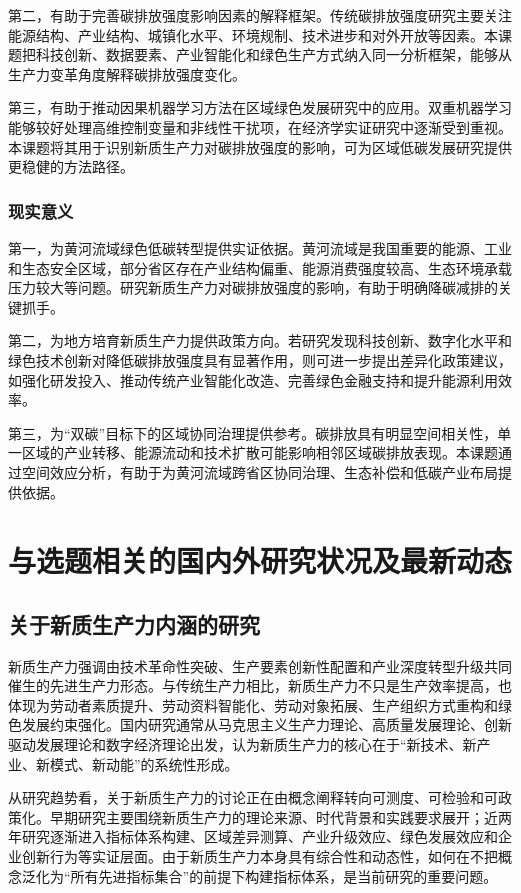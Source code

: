 \documentclass[UTF8,a4paper,zihao=-4,fontset=windows]{ctexart}
\newcommand{\regionscope}{黄河流域}
\begin{document}
第二，有助于完善碳排放强度影响因素的解释框架。传统碳排放强度研究主要关注能源结构、产业结构、城镇化水平、环境规制、技术进步和对外开放等因素。本课题把科技创新、数据要素、产业智能化和绿色生产方式纳入同一分析框架，能够从生产力变革角度解释碳排放强度变化。

第三，有助于推动因果机器学习方法在区域绿色发展研究中的应用。双重机器学习能够较好处理高维控制变量和非线性干扰项，在经济学实证研究中逐渐受到重视。本课题将其用于识别新质生产力对碳排放强度的影响，可为区域低碳发展研究提供更稳健的方法路径。

\subsubsection{现实意义}

第一，为\regionscope 绿色低碳转型提供实证依据。\regionscope 是我国重要的能源、工业和生态安全区域，部分省区存在产业结构偏重、能源消费强度较高、生态环境承载压力较大等问题。研究新质生产力对碳排放强度的影响，有助于明确降碳减排的关键抓手。

第二，为地方培育新质生产力提供政策方向。若研究发现科技创新、数字化水平和绿色技术创新对降低碳排放强度具有显著作用，则可进一步提出差异化政策建议，如强化研发投入、推动传统产业智能化改造、完善绿色金融支持和提升能源利用效率。

第三，为“双碳”目标下的区域协同治理提供参考。碳排放具有明显空间相关性，单一区域的产业转移、能源流动和技术扩散可能影响相邻区域碳排放表现。本课题通过空间效应分析，有助于为\regionscope 跨省区协同治理、生态补偿和低碳产业布局提供依据。

\section{与选题相关的国内外研究状况及最新动态}

\subsection{关于新质生产力内涵的研究}

新质生产力强调由技术革命性突破、生产要素创新性配置和产业深度转型升级共同催生的先进生产力形态。与传统生产力相比，新质生产力不只是生产效率提高，也体现为劳动者素质提升、劳动资料智能化、劳动对象拓展、生产组织方式重构和绿色发展约束强化。国内研究通常从马克思主义生产力理论、高质量发展理论、创新驱动发展理论和数字经济理论出发，认为新质生产力的核心在于“新技术、新产业、新模式、新动能”的系统性形成。

从研究趋势看，关于新质生产力的讨论正在由概念阐释转向可测度、可检验和可政策化。早期研究主要围绕新质生产力的理论来源、时代背景和实践要求展开；近两年研究逐渐进入指标体系构建、区域差异测算、产业升级效应、绿色发展效应和企业创新行为等实证层面。由于新质生产力本身具有综合性和动态性，如何在不把概念泛化为“所有先进指标集合”的前提下构建指标体系，是当前研究的重要问题。
\end{document}

